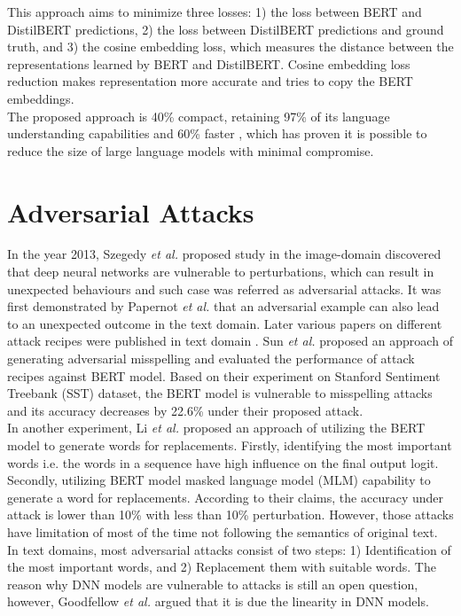 \documentclass[%
	BCOR=8mm, %
	DIV=12,
	toc=bibliography, %
	toc=listof, %
	oneside, %
	egregdoesnotlikesansseriftitles, %
	]{scrbook}
\begin{document}
This approach aims to minimize three losses: 1) the loss between BERT and DistilBERT predictions, 2) the loss between DistilBERT predictions and ground truth, and 3) the cosine embedding loss, which measures the distance between the representations learned by BERT and DistilBERT. Cosine embedding loss reduction makes representation more accurate and tries to copy the BERT embeddings.\\
 The proposed approach is 40\% compact, retaining 97\% of its language understanding capabilities and 60\% faster \cite{sanh_distilbert_2020}, which has proven it is possible to reduce the size of large language models with minimal compromise.
\section{Adversarial Attacks}
\label{section:advattacks}
In the year 2013, Szegedy \textit{et al.} \cite{szegedy_intriguing_2014} proposed study in the image-domain discovered that deep neural networks are vulnerable to perturbations, which can result in unexpected behaviours and such case was referred as adversarial attacks. It was first demonstrated by Papernot \textit{et al.}  \cite{papernot_crafting_2016} that an adversarial example can also lead to an unexpected outcome in the text domain. Later various papers on different attack recipes were published in text domain \cite{alzantot_generating_2018,li_bert-attack_2020,gao_black-box_2018,li_bert-attack_2020,ren_generating_2019,garg_bae_2020,chen_robustness_2019}.  Sun \textit{et al.}  \cite{sun_adv-bert_2020} proposed an approach of  generating adversarial misspelling and evaluated the performance of  attack recipes  against BERT model. Based on their experiment on Stanford Sentiment Treebank (SST) dataset, the BERT model is vulnerable to misspelling attacks and its accuracy decreases by 22.6\% under their proposed attack.\\
In another experiment, Li \textit{et al.} \cite{li_bert-attack_2020} proposed an approach of utilizing the BERT model to generate words for replacements. Firstly, identifying the most important words i.e. the words in a sequence have high influence on the final output logit. Secondly, utilizing BERT model masked language model (MLM) capability to generate a word for replacements. According to their claims, the accuracy under attack is lower than 10\% with less than 10\% perturbation. However, those attacks have limitation of most of the time not following the semantics of original text. \\
In text domains, most adversarial attacks consist of two steps: 1) Identification of the most important words, and 2) Replacement them with suitable words. The reason why DNN models are vulnerable to attacks is still an open question, however, Goodfellow \textit{et al.} \cite{goodfellow_explaining_2015} argued that it is due the linearity in DNN models.
\end{document}
